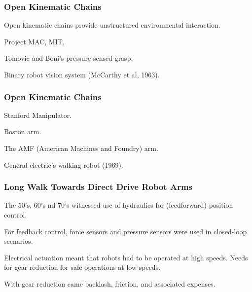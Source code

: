 \begin{frame}
	\frametitle{Open Kinematic Chains}
	\begin{tcolorbox}[coltitle=blue!80!yellow,colframe=brown!80]
		Open kinematic chains provide unstructured environmental interaction.
	\end{tcolorbox}
	\begin{tcolorbox}[coltitle=blue!80!yellow,colframe=gray!100]
		Project MAC, MIT.
	\end{tcolorbox}
	\begin{tcolorbox}[coltitle=blue!80!yellow,colframe=black!80]
		Tomovic and Boni's pressure sensed grasp.
	\end{tcolorbox}
	\begin{tcolorbox}[coltitle=blue!80!yellow,colframe=pink!100]
		Binary robot vision system (McCarthy et al, 1963).
	\end{tcolorbox}
\end{frame}

\begin{frame}
	\frametitle{Open Kinematic Chains}
	\begin{tcolorbox}[coltitle=cyan!80,colframe=green!100]
		Stanford Manipulator.
	\end{tcolorbox}
	\begin{tcolorbox}[coltitle=blue!80!yellow,colframe=blue!100]
		Boston arm.
	\end{tcolorbox}
	\begin{tcolorbox}[coltitle=blue!80!yellow,colframe=red!100]
		The AMF (American Machines and Foundry) arm.
	\end{tcolorbox}
	\begin{tcolorbox}[coltitle=blue!80!yellow,colframe=yellow!100]
		General electric's walking robot (1969).
	\end{tcolorbox}
\end{frame}


\begin{frame}
	\frametitle{Long Walk Towards Direct Drive Robot Arms}
	
	\begin{tcolorbox}[coltitle=magenta!80!green,colframe=yellow!80!green]
		The 50's, 60's nd 70's witnessed use of hydraulics  for (feedforward) position control.
	\end{tcolorbox}
	
	\begin{tcolorbox}[coltitle=magenta!80!green,colframe=blue!80!green] 
		For feedback control, force sensors and pressure sensors were used in closed-loop scenarios.
	\end{tcolorbox}

	\begin{tcolorbox}[coltitle=magenta!80!green,colframe=red!80!green] 
		Electrical actuation meant that robots had to be operated at high speeds. Needs for gear reduction for safe operations at low speeds. 
	\end{tcolorbox}

	\begin{tcolorbox}[coltitle=magenta!80!green,colframe=brown!80!green]
		 With gear reduction came backlash, friction, and associated expenses.
	\end{tcolorbox}
\end{frame}


